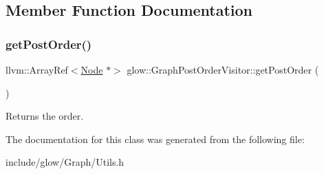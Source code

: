 \subsection{Member Function Documentation}
\mbox{\label{classglow_1_1_graph_post_order_visitor_ad0e6253030f155ffd071699f41906798}} 
\subsubsection{\texorpdfstring{get\+Post\+Order()}{getPostOrder()}}
{\footnotesize\ttfamily llvm\+::\+Array\+Ref$<$\hyperlink{classglow_1_1_node}{Node} $\ast$$>$ glow\+::\+Graph\+Post\+Order\+Visitor\+::get\+Post\+Order (\begin{DoxyParamCaption}{ }\end{DoxyParamCaption})\hspace{0.3cm}{\ttfamily [inline]}}

\begin{DoxyReturn}{Returns}
the order. 
\end{DoxyReturn}


The documentation for this class was generated from the following file\+:\begin{DoxyCompactItemize}
\item 
include/glow/\+Graph/Utils.\+h\end{DoxyCompactItemize}
